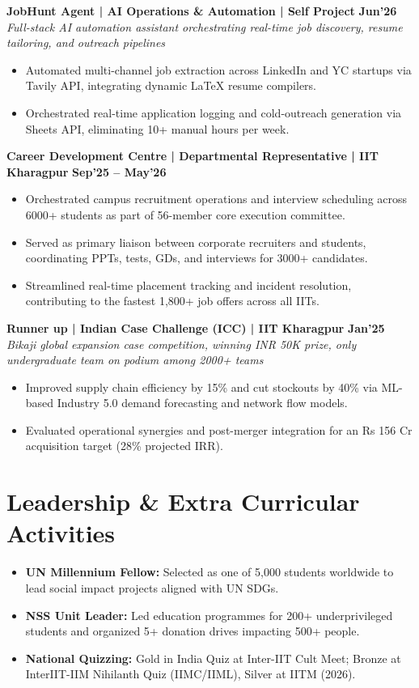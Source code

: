 \documentclass[10pt, a4paper]{article}
\newenvironment{achievelist}{
  \begin{itemize}[leftmargin=1.2em, itemsep=0.5pt, parsep=0pt, topsep=1pt]
    \small
}{
  \end{itemize}
  \vspace{-2pt}
}
\newcommand{\achieve}[1]{\item #1}
\begin{document}
\textbf{JobHunt Agent | AI Operations \& Automation | Self Project} \hfill \textbf{\small Jun'26} \\
\textit{\small Full-stack AI automation assistant orchestrating real-time job discovery, resume tailoring, and outreach pipelines}
\begin{achievelist}
  \achieve{Automated multi-channel job extraction across LinkedIn and YC startups via Tavily API, integrating dynamic LaTeX resume compilers.}
  \achieve{Orchestrated real-time application logging and cold-outreach generation via Sheets API, eliminating 10+ manual hours per week.}
\end{achievelist}

\textbf{Career Development Centre | Departmental Representative | IIT Kharagpur} \hfill \textbf{\small Sep'25 -- May'26}
\begin{achievelist}
  \achieve{Orchestrated campus recruitment operations and interview scheduling across 6000+ students as part of 56-member core execution committee.}
  \achieve{Served as primary liaison between corporate recruiters and students, coordinating PPTs, tests, GDs, and interviews for 3000+ candidates.}
  \achieve{Streamlined real-time placement tracking and incident resolution, contributing to the fastest 1,800+ job offers across all IITs.}
\end{achievelist}

\textbf{Runner up | Indian Case Challenge (ICC) | IIT Kharagpur} \hfill \textbf{\small Jan'25} \\
\textit{\small Bikaji global expansion case competition, winning INR 50K prize, only undergraduate team on podium among 2000+ teams}
\begin{achievelist}
  \achieve{Improved supply chain efficiency by 15\% and cut stockouts by 40\% via ML-based Industry 5.0 demand forecasting and network flow models.}
  \achieve{Evaluated operational synergies and post-merger integration for an Rs 156 Cr acquisition target (28\% projected IRR).}
\end{achievelist}

\vspace{-2pt}

\section{Leadership \& Extra Curricular Activities}

\begin{itemize}[leftmargin=1.2em, itemsep=0.5pt, parsep=0pt, topsep=1pt]
  \small
  \item \textbf{UN Millennium Fellow:} Selected as one of 5,000 students worldwide to lead social impact projects aligned with UN SDGs.
  \item \textbf{NSS Unit Leader:} Led education programmes for 200+ underprivileged students and organized 5+ donation drives impacting 500+ people.
  \item \textbf{National Quizzing:} Gold in India Quiz at Inter-IIT Cult Meet; Bronze at InterIIT-IIM Nihilanth Quiz (IIMC/IIML), Silver at IITM (2026).
\end{itemize}
\end{document}
